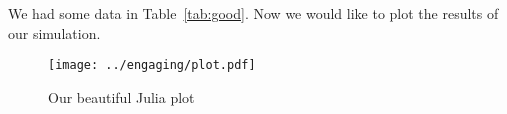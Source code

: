 
We had some data in Table~\ref{tab:good}. Now we would like to plot the results of our simulation.

\begin{figure}[h]
\centering
\texttt{[image: ../engaging/plot.pdf]}
\caption{Our beautiful Julia plot}
\label{fig:plot}
\end{figure}
